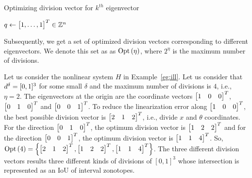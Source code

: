 \begin{algorithm}
\caption{Optimizing division vector for $k^{th}$
eigenvector} $q\gets \begin{bmatrix}1,\ldots,1\end{bmatrix}^T\in\mathbb{Z}^n$\;
\end{algorithm}
%
Subsequently, we get a set of optimized division vectors corresponding
to different eigenvectors.  We denote this set as as $\operatorname*{Opt}\left(\eta\right)$,
where $2^\eta$ is the maximum number of divisions.
%
\begin{example}
Let us consider the nonlinear system $H$ in Example~\ref{eg:ill}.  Let
us consider that $d^\delta = [0,1]^3$ for some small $\delta$
and the maximum number of divisions is $4$, i.e., $\eta = 2$.  The
eigenvectors at the origin are the coordinate vectors $\begin{bmatrix}1 & 0
& 0\end{bmatrix}^T$, $\begin{bmatrix}0 & 1 & 0\end{bmatrix}^T$ and $\begin{bmatrix}0 & 0 & 1\end{bmatrix}^T$.  To
reduce the linearization error along $\begin{bmatrix}1 & 0 & 0\end{bmatrix}^T$, the
best possible division vector is $\begin{bmatrix}2 & 1 & 2\end{bmatrix}^T$, i.e.,
divide $x$ and $\theta$ coordinates.  For the direction $\begin{bmatrix}0 &
1 &0\end{bmatrix}^T$, the optimum division vector is $\begin{bmatrix}1 & 2 & 2\end{bmatrix}^T$ and
for the direction $\begin{bmatrix}0 & 0 & 1\end{bmatrix}^T$, the optimum division
vector is $\begin{bmatrix}1 & 1 & 4\end{bmatrix}^T$.  So, $\operatorname*{Opt}\left(4\right) = \left\{\begin{bmatrix}2
& 1 & 2\end{bmatrix}^T, \begin{bmatrix}1 & 2 & 2\end{bmatrix}^T, \begin{bmatrix}1 & 1 & 4\end{bmatrix}^T\right\}$.  The
three different division vectors results three different kinds of
divisions of $[0,1]^3$ whose intersection is represented as an IoU of
interval zonotopes.
\end{example}
%
